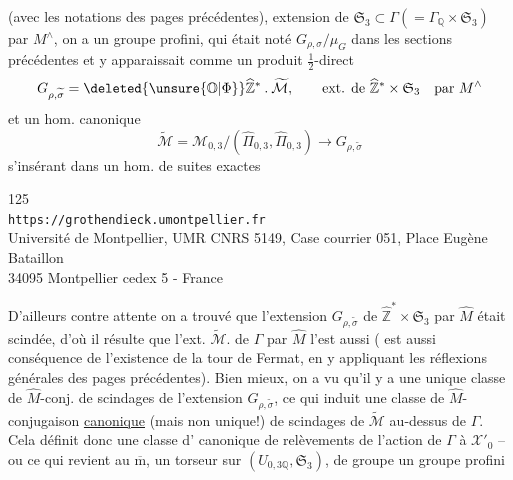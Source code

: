 
 (avec les notations des pages précédentes), extension de $\mathfrak S_3\subset\Gamma(=\Gamma_{\mathbb Q}\times\mathfrak S_3)$ par $M^\wedge$, on a  un groupe profini,  qui était noté $G_{\rho,\sigma}/\mu_G$  dans les sections précédentes et y apparaissait comme un produit $\frac12$-direct
\[
G_{\rho,\widetilde\sigma}
=\deleted{\unsure{\mathbb O|\Phi}}\widehat{\mathbb Z}^{*}\mathbin{.}\widetilde{\mathcal M},
\qquad\text{ext. de }\widehat{\mathbb Z}^{*}\times\mathfrak S_3
\quad\text{par }M^\wedge
\]
et un hom. canonique
\[
\widetilde{\mathcal M}
=\mathcal M_{0,3}/(\widehat\Pi_{0,3},\widehat\Pi_{0,3})
\longrightarrow G_{\rho,\widetilde\sigma}
\]
s'insérant dans un hom. de suites exactes


\begin{center}
\small
125\\
\texttt{https://grothendieck.umontpellier.fr}\\
Université de Montpellier, UMR CNRS 5149, Case courrier 051, Place Eugène Bataillon\\
34095 Montpellier cedex 5 - France
\end{center}

\diagram{
\[
\begin{tikzcd}[column sep=large,row sep=huge]
1 \arrow[r,no head] &
\widehat M \arrow[r] \arrow[d,Rightarrow] &
\widetilde{\mathcal M} \arrow[r] \arrow[d] &
\underbrace{\Gamma}_{N_{0,3}=\Gamma_{\mathbb Q}\times\mathfrak S_3}
\arrow[r,no head] \arrow[d,"\unsure{\chi}\times\operatorname{id}_{\mathfrak S_3}"] & 1 \\
1 \arrow[r,no head] &
\widehat M \arrow[r,no head] &
G_{\rho,\widetilde\sigma} \arrow[r] &
\widehat{\mathbb Z}^{*}\times\mathfrak S_3 \arrow[r,no head] & 1 .
\end{tikzcd}
\tag{282}
\]
}

D'ailleurs contre  attente on a trouvé que l'extension $G_{\rho,\widetilde\sigma}$ de $\widehat{\mathbb Z}^{*}\times\mathfrak S_3$ par $\widehat M$ était scindée, d'où il résulte que  l'ext. $\widetilde{\mathcal M}$. de $\Gamma$ par $\widehat M$ l'est aussi (  est aussi conséquence de l'existence de la tour de Fermat, en y appliquant les réflexions générales des pages précédentes). Bien mieux, on a vu qu'il y a une unique classe de $\widehat M$-conj. de scindages de l'extension $G_{\rho,\widetilde\sigma}$, ce qui induit une classe de $\widehat M$-conjugaison \uline{canonique} (mais non unique!) de  scindages de $\widetilde{\mathcal M}$ au-dessus de $\Gamma$. Cela définit donc une classe d' canonique de relèvements de l'action de $\Gamma$  à $\mathcal X'_0$ -- ou ce qui revient au $\overline{\mathrm m}$, un torseur sur $(U_{0,3\mathbb Q},\mathfrak S_3)$, de groupe un groupe profini

